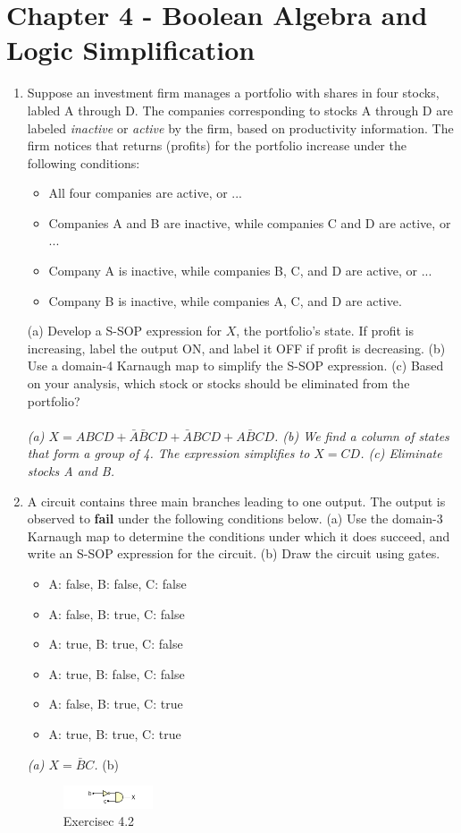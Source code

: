\documentclass[10pt]{article}
\begin{document}
\section{Chapter 4 - Boolean Algebra and Logic Simplification}

\begin{enumerate}
\item Suppose an investment firm manages a portfolio with shares in four stocks, labled A through D.  The companies corresponding to stocks A through D are labeled \textit{inactive} or \textit{active} by the firm, based on productivity information.  The firm notices that returns (profits) for the portfolio increase under the following conditions:
\begin{itemize}
\item All four companies are active, or ...
\item Companies A and B are inactive, while companies C and D are active, or ...
\item Company A is inactive, while companies B, C, and D are active, or ...
\item Company B is inactive, while companies A, C, and D are active.
\end{itemize}
(a) Develop a S-SOP expression for $X$, the portfolio's state.  If profit is increasing, label the output ON, and label it OFF if profit is decreasing. (b) Use a domain-4 Karnaugh map to simplify the S-SOP expression. (c) Based on your analysis, which stock or stocks should be eliminated from the portfolio?  \\ \\
\textit{(a) $X = ABCD + \bar{A}\bar{B}CD + \bar{A}BCD + A\bar{B}CD$. (b) We find a column of states that form a group of 4.  The expression simplifies to $X=CD$. (c) Eliminate stocks A and B.}
\item A circuit contains three main branches leading to one output.  The output is observed to \textbf{fail} under the following conditions below.  (a) Use the domain-3 Karnaugh map to determine the conditions under which it does succeed, and write an S-SOP expression for the circuit. (b) Draw the circuit using gates.
\begin{itemize}
\item A: false, B: false, C: false
\item A: false, B: true, C: false
\item A: true, B: true, C: false
\item A: true, B: false, C: false
\item A: false, B: true, C: true
\item A: true, B: true, C: true
\end{itemize}
\textit{(a) $X=\bar{B}C$.}
(b)
\begin{figure}[hb]
\centering
\includegraphics[width=0.25\textwidth]{gates_1.png}
\caption{Exercisec 4.2}
\end{figure}
\end{enumerate}
\end{document}
